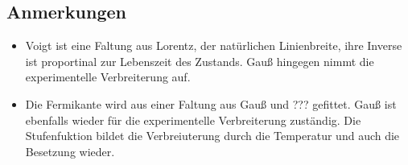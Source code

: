             \subsection{Anmerkungen}
            \begin{itemize}
                \item Voigt ist eine Faltung aus Lorentz, der natürlichen Linienbreite, ihre Inverse ist proportinal zur Lebenszeit des Zustands. Gauß hingegen nimmt die experimentelle Verbreiterung auf.
                \item Die Fermikante wird aus einer Faltung aus Gauß und ??? gefittet. Gauß ist ebenfalls wieder für die experimentelle Verbreiterung zuständig. Die Stufenfuktion bildet die Verbreiuterung durch die Temperatur und auch die Besetzung wieder.
            \end{itemize}